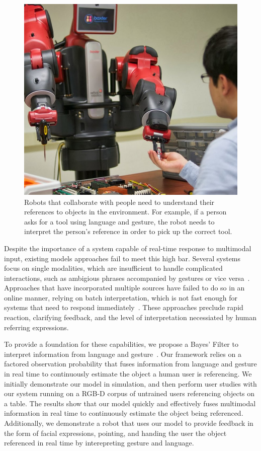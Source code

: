 \documentclass[a4paper, 11pt]{article} %
\begin{document}
\begin{figure}[h]
\centering
\includegraphics[width=0.3\linewidth]{images/baxter_scene_cropped.jpg}
\caption{Robots that collaborate with people need to understand their
  references to objects in the environment.  For example, if a person
  asks for a tool using language and gesture, the robot needs to
  interpret the person's reference in order to pick up the correct
  tool.\label{fig:example}}
\end{figure}

Despite the importance of a system capable of real-time response to multimodal input, existing models approaches fail to meet this high bar. Several systems focus on single modalities, which are insufficient to handle complicated interactions, such as ambigious phrases accompanied by gestures or vice versa~\citep{tellex11, kollar10}. Approaches that have incorporated multiple sources have failed to do so in an online manner, relying on batch interpretation, which is not fast enough for systems that need to respond immediately~\citep{matuszek14}. These approaches preclude rapid reaction, clarifying feedback, and the level of interpretation necessiated by human referring expressions.

To provide a foundation for these capabilities, we propose a Bayes' Filter to interpret information from language and gesture~\citep{thrun08}. Our framework relies on a factored observation probability that fuses information from language and gesture in real time to continuously estimate the object a human user is referencing. We initially demonstrate our model in simulation, and then perform user studies with our system running on a RGB-D corpus of untrained users referencing objects on a table. The results show that our model quickly and effectively fuses multimodal information in real time to continuously estimate the object being referenced. Additionally, we demonstrate a robot that uses our model to provide feedback in the form of facial expressions, pointing, and handing the user the object referenced in real time by interepreting gesture and language.
\end{document}
